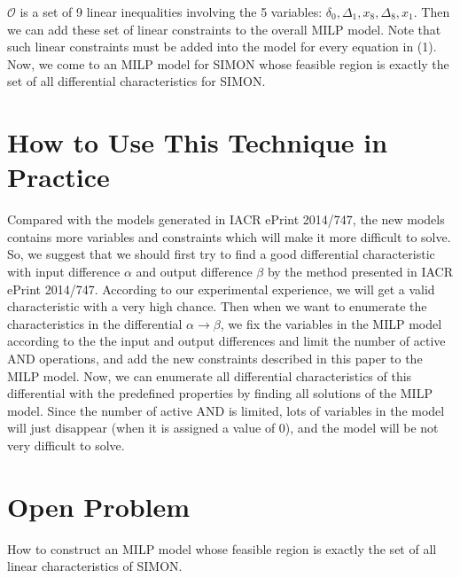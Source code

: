 \documentclass[runningheads]{llncs}
\begin{document}
$\mathcal{O}$ is a set of 9 linear inequalities involving the 5 variables: $\delta_0, \Delta_1, x_8, \Delta_8, x_1$. Then we can add these set of linear constraints to the overall MILP model. Note that such linear constraints must be added into the model for every equation in (1). Now, we come to an MILP model for SIMON whose feasible region is exactly the set of all differential characteristics for SIMON.



\section{How to Use This Technique in Practice}
Compared with the models generated in IACR ePrint 2014/747, the new models contains more variables and constraints which will make it more difficult to solve. So, we suggest that we should first try to find a good differential characteristic with input difference $\alpha$ and output difference $\beta$ by the method presented in IACR ePrint 2014/747. According to our experimental experience, we will get a valid characteristic with a very high chance. Then when we want to enumerate the characteristics in the differential $\alpha \rightarrow \beta$, we fix the variables in the MILP model according to the the input and output differences and limit the number of active AND operations, and add the new constraints described in this paper to the MILP model. Now, we can enumerate all differential characteristics of this differential with the predefined properties by finding all solutions of the MILP model. Since the number of active AND is limited, lots of variables in the model will just disappear (when it is assigned a value of 0), and the model will be not very difficult to solve. 

\section{Open Problem}
How to construct an MILP model whose feasible region is exactly the set of all linear characteristics of SIMON.



\end{document}
